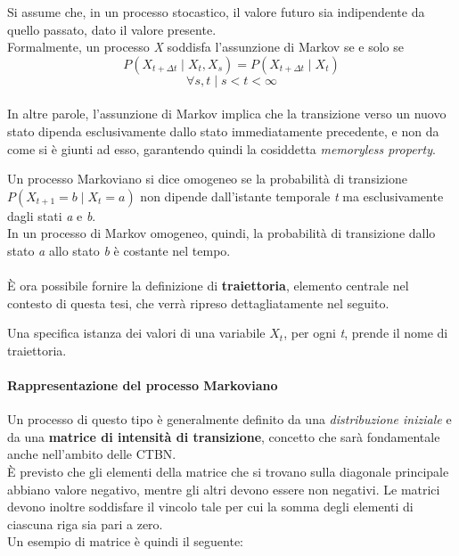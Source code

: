   \begin{assumption} \cite{ctmp}
    Si assume che, in un processo stocastico, il valore futuro sia indipendente da quello passato, dato il valore presente.\\
    Formalmente, un processo \textit{X} soddisfa l'assunzione di Markov se e solo se
    \begin{equation}
      P(X_{t+\Delta t} \; | \; X_t, X_s) = P(X_{t+\Delta t} \; | \; X_t)
    \end{equation}
    \[
      \forall s, t \; | \; s<t<\infty
    \]
  \end{assumption}

  \paragraph{}
  In altre parole, l'assunzione di Markov implica che la transizione verso un nuovo stato dipenda esclusivamente dallo stato immediatamente precedente,
  e non da come si è giunti ad esso, garantendo quindi la cosiddetta \textit{memoryless property}.
  
  \begin{definition} \cite{markov-chains}
    Un processo Markoviano si dice omogeneo se la probabilità di transizione $P(X_{t+1} = b \; | \; X_t = a)$ non dipende
    dall'istante temporale \emph{t} ma esclusivamente dagli stati \emph{a} e \emph{b}.\\
    In un processo di Markov omogeneo, quindi, la probabilità di transizione dallo stato \emph{a} allo 
    stato \emph{b} è costante nel tempo.
  \end{definition}

  \paragraph{}
  È ora possibile fornire la definizione di \textbf{traiettoria}, elemento centrale nel contesto di questa tesi, 
  che verrà ripreso dettagliatamente nel seguito.

  \begin{definition}[Traiettoria]
    Una specifica istanza dei valori di una variabile $X_t$, per ogni \textit{t}, prende il nome di traiettoria.  
  \end{definition}

  \paragraph{Rappresentazione del processo Markoviano}
    Un processo di questo tipo è generalmente definito da una \textit{distribuzione iniziale} e da una
    \textbf{matrice di intensità di transizione}, concetto che sarà fondamentale anche nell'ambito delle
    CTBN.\\
    È previsto che gli elementi della matrice che si trovano sulla diagonale principale abbiano valore negativo, mentre
    gli altri devono essere non negativi.
    Le matrici devono inoltre soddisfare il vincolo tale per cui la somma degli elementi di ciascuna riga sia pari a zero.\\
    Un esempio di matrice è quindi il seguente:


